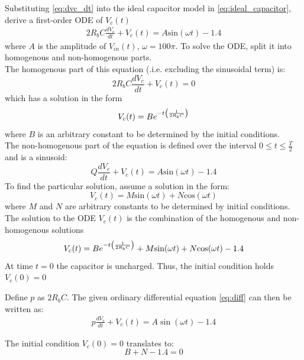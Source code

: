 Substituting \eqref{eq:dvc_dt} into the ideal capacitor model in \eqref{eq:ideal_capacitor}, derive a first-order ODE of $V_c(t)$
\begin{align}
	2R_bC\frac{dV_c}{dt} + V_c(t) = A\text{sin}(\omega t) - 1.4
	\label{eq:diff}
\end{align}
where $A$ is the amplitude of $V_{in}(t)$, $\omega = 100\pi$. To solve the ODE, split it into homogenous and non-homogenous parts. \\

The homogenous part of this equation (.i.e. excluding the sinusoidal term) is:
\begin{equation}
	2R_bC\frac{dV_c}{dt} + V_c(t) = 0
\end{equation}
which has a solution in the form
\begin{equation}
	V_c(t) = Be^{-t\left(\frac{1}{2R_bC} \right)}
\end{equation}
where $B$ is an arbitrary constant to be determined by the initial conditions. 
\\

The non-homogenous part of the equation is defined over the interval $0 \leq t \leq \frac{T}{2}$ and is a sinusoid:
\begin{equation}
	Q\frac{dV_c}{dt} + V_c(t) = A\text{sin}(\omega t) - 1.4
\end{equation}
To find the particular solution, assume a solution in the form:
\begin{equation}
	V_c(t) = M\text{sin}(\omega t) + N\text{cos}(\omega t) 
	\label{vc_t}
\end{equation}
where $M$ and $N$ are arbitrary constants to be determined by initial conditions.\\

The solution to the ODE $V_c(t)$ is the combination of the homogenous and non-homogenous solutions
\begin{equation}
	V_c(t) = Be^{-t\left(\frac{1}{2R_bC} \right)} + M\text{sin}(\omega t) + N\text{cos}(\omega t) - 1.4
\end{equation}
At time $t=0$ the capacitor is uncharged. Thus, the initial condition holds $V_c(0) = 0$

Define $p$ as $2R_bC$. The given ordinary differential equation \eqref{eq:diff} can then be written as:
\begin{align}
p\frac{dV_c}{dt} + V_c(t) = A\sin(\omega t) - 1.4
\end{align}

The initial condition $V_c(0) = 0$ translates to:
\begin{equation}
B + N - 1.4 = 0
\end{equation}

